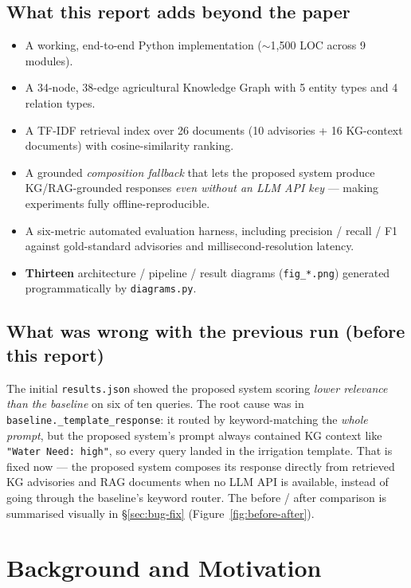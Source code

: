 \documentclass[11pt,a4paper]{article}
\begin{document}
\subsection*{What this report adds beyond the paper}
\begin{itemize}[leftmargin=*]
  \item A working, end-to-end Python implementation
        ($\sim$1{,}500 LOC across 9 modules).
  \item A 34-node, 38-edge agricultural Knowledge Graph with 5 entity
        types and 4 relation types.
  \item A TF-IDF retrieval index over 26 documents (10 advisories +
        16 KG-context documents) with cosine-similarity ranking.
  \item A grounded \emph{composition fallback} that lets the proposed
        system produce KG/RAG-grounded responses \emph{even without an
        LLM API key} --- making experiments fully offline-reproducible.
  \item A six-metric automated evaluation harness, including
        precision / recall / F1 against gold-standard advisories and
        millisecond-resolution latency.
  \item \textbf{Thirteen} architecture / pipeline / result diagrams
        (\texttt{fig\_*.png}) generated programmatically by
        \texttt{diagrams.py}.
\end{itemize}

\subsection*{What was wrong with the previous run (before this report)}
The initial \texttt{results.json} showed the proposed system scoring
\emph{lower relevance than the baseline} on six of ten queries. The
root cause was in \texttt{baseline.\_template\_response}: it routed
by keyword-matching the \emph{whole prompt}, but the proposed system's
prompt always contained KG context like \texttt{"Water Need: high"},
so every query landed in the irrigation template. That is fixed now ---
the proposed system composes its response directly from retrieved KG
advisories and RAG documents when no LLM API is available, instead of
going through the baseline's keyword router. The before / after
comparison is summarised visually in \S\ref{sec:bug-fix}
(Figure~\ref{fig:before-after}).

\section{Background and Motivation}\label{sec:background}
\end{document}
